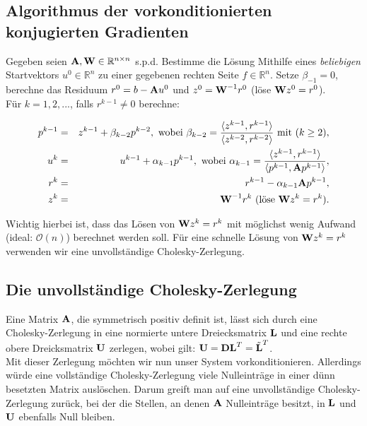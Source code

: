 \subsection{Algorithmus der vorkonditionierten konjugierten Gradienten}\label{ss.Algorithmus PCG}

Gegeben seien ${\textbf{A}}, {\textbf{W}} \in \mathbb{R}^{n \times n}$ s.p.d. Bestimme die Lösung Mithilfe eines \textit{beliebigen} Startvektors $u^{0} \in \mathbb{R}^{n}$ zu einer gegebenen rechten Seite $f \in \mathbb{R}^{n}$. Setze $\beta_{-1} = 0$, berechne das Residuum $r^{0} = b - {\textbf{A}}u^{0}$ und $z^{0} = {\textbf{W}}^{-1}r^{0}$ (löse ${\textbf{W}}z^{0} = r^{0}$).\\
Für $k = 1,2,...$, falls $r^{k-1} \ne 0$ berechne:

\begin{eqnarray}
p^{k-1} &=& z^{k-1} + \beta_{k-2}p^{k-2}, \textnormal{ wobei } \beta_{k-2} = \frac {\langle z^{k-1}, r^{k-1} \rangle} {\langle z^{k-2}, r^{k-2} \rangle} \textnormal{ mit } (k \ge 2), \notag \\
u^{k} &=& u^{k-1} + \alpha_{k-1}p^{k-1}, \textnormal{ wobei } \alpha_{k-1} = \frac {\langle z^{k-1}, r^{k-1} \rangle} {\langle p^{k-1}, {\textbf{A}}p^{k-1} \rangle}, \notag \\
r^{k} &=& r^{k-1} - \alpha_{k-1}{\textbf{A}}p^{k-1}, \notag \\
z^{k} &=& {\textbf{W}}^{-1}r^{k} \textnormal{ (löse } {\textbf{W}}z^{k} = r^{k}). \notag
\end{eqnarray}

Wichtig hierbei ist, dass das Lösen von ${\textbf{W}}z^{k} = r^{k}$ mit möglichst wenig Aufwand (ideal: $\mathcal{O}(n)$) berechnet werden soll. Für eine schnelle Lösung von ${\textbf{W}} z^{k} = r^{k}$ verwenden wir eine unvollständige Cholesky-Zerlegung.

\subsection{Die unvollständige Cholesky-Zerlegung}\label{ss.ICCG}

Eine Matrix ${\textbf{A}}$, die symmetrisch positiv definit ist, lässt sich durch eine Cholesky-Zerlegung in eine normierte untere Dreiecksmatrix ${\textbf{L}}$ und eine rechte obere Dreicksmatrix ${\textbf{U}}$ zerlegen, wobei gilt: ${\textbf{U}} = {\textbf{D}}{\textbf{L}}^{T} = \tilde{{\textbf{L}}}^{T}$. \\
Mit dieser Zerlegung möchten wir nun unser System vorkonditionieren. Allerdings würde eine vollständige Cholesky-Zerlegung viele Nulleinträge in einer dünn besetzten Matrix auslöschen. Darum greift man auf eine unvollständige Cholesky-Zerlegung zurück, bei der die Stellen, an denen ${\textbf{A}}$ Nulleinträge besitzt, in ${\textbf{L}}$ und ${\textbf{U}}$ ebenfalls Null bleiben.

